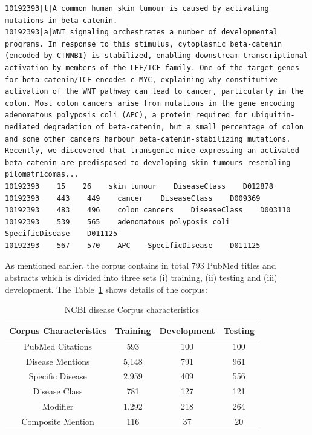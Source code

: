 \begin{lstlisting}[caption=An example of annotation, label=annotation]
10192393|t|A common human skin tumour is caused by activating mutations in beta-catenin.
10192393|a|WNT signaling orchestrates a number of developmental programs. In response to this stimulus, cytoplasmic beta-catenin (encoded by CTNNB1) is stabilized, enabling downstream transcriptional activation by members of the LEF/TCF family. One of the target genes for beta-catenin/TCF encodes c-MYC, explaining why constitutive activation of the WNT pathway can lead to cancer, particularly in the colon. Most colon cancers arise from mutations in the gene encoding adenomatous polyposis coli (APC), a protein required for ubiquitin-mediated degradation of beta-catenin, but a small percentage of colon and some other cancers harbour beta-catenin-stabilizing mutations. Recently, we discovered that transgenic mice expressing an activated beta-catenin are predisposed to developing skin tumours resembling pilomatricomas... 
10192393    15    26    skin tumour    DiseaseClass    D012878
10192393    443    449    cancer    DiseaseClass    D009369
10192393    483    496    colon cancers    DiseaseClass    D003110
10192393    539    565    adenomatous polyposis coli    SpecificDisease    D011125
10192393    567    570    APC    SpecificDisease    D011125

\end{lstlisting}

As mentioned earlier, the corpus contains in total 793 PubMed titles and abstracts which is divided into three sets (i) training, (ii) testing and (iii) development. The Table~\ref{table_ncbi} shows details of the corpus:

\begin{table}[h!]
\caption{NCBI disease Corpus characteristics}
\label{table_ncbi}
\begin{tabular}{|c|c|c|c|}
\hline
\textbf{Corpus Characteristics} & \textbf{Training} & \textbf{Development} & \textbf{Testing} \\ \hline
PubMed Citations                & 593               & 100                  & 100              \\ \hline
Disease Mentions                & 5,148             & 791                  & 961              \\ \hline
Specific Disease                & 2,959             & 409                  & 556              \\ \hline
Disease Class                   & 781               & 127                  & 121              \\ \hline
Modifier                        & 1,292             & 218                  & 264              \\ \hline
Composite Mention               & 116               & 37                   & 20               \\ \hline
\end{tabular}
\end{table}

